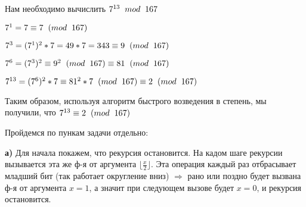\documentclass[12pt]{extreport}
\theoremstyle{definition}
\theoremstyle{definition}
\newcounter{problem}
\newcounter{subproblem}
\def\PRSUBskip{
	\medskip
}
\def\prsub{\PRSUBskip\noindent\stepcounter{subproblem}{\sf \thesubproblem .} }
\begin{document}
\Pr \hspace{1mm} Нам необходимо вычислить $7^{13} \hspace{2mm} mod \hspace{2mm} 167$

\hspace{4mm} $7^1 = 7 \equiv 7 \hspace{2mm} (mod \hspace{2mm} 167)$

\hspace{4mm} $7^3 = (7^1)^2 * 7 = 49 * 7 = 343 \equiv 9 \hspace{2mm} (mod \hspace{2mm} 167)$

\hspace{4mm} $7^6 = (7^3)^2 \equiv 9^2 \hspace{2mm} (mod \hspace{2mm} 167) \equiv 81 \hspace{2mm} (mod \hspace{2mm} 167)$

\hspace{4mm} $7^{13} = (7^6)^2 * 7 \equiv 81^2 * 7 \hspace{2mm} (mod \hspace{2mm} 167) \equiv 2 \hspace{2mm} (mod \hspace{2mm} 167)$

\medskip

\hspace{4mm} Таким образом, используя алгоритм быстрого возведения в степень, мы получили, что $7^{13} \equiv 2 \hspace{2mm} (mod \hspace{2mm} 167)$

\Pr \hspace{1mm} Пройдемся по пункам задачи отдельно:

\prsub \textbf{а)} Для начала покажем, что рекурсия остановится. На кадом шаге рекурсии вызывается эта же ф-я от аргумента $\lfloor \frac{x}{2} \rfloor$. Эта операция каждый раз отбрасывает младший бит (так работает округление вниз) $\Rightarrow$ рано или поздно будет вызвана ф-я от аргумента $x = 1$, а значит при следующем вызове будет $x = 0$, и рекурсия остановится.  
\end{document}
